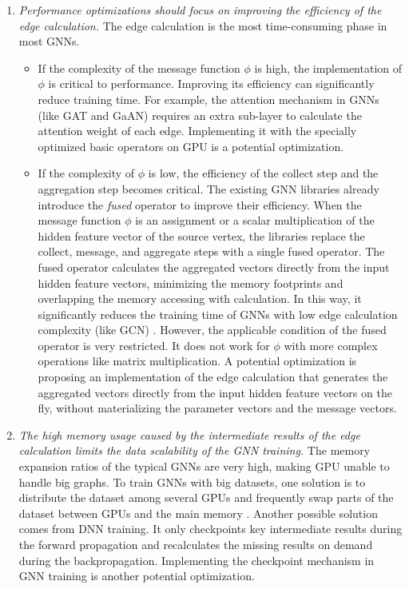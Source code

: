 \begin{enumerate}
    \item \emph{Performance optimizations should focus on improving the efficiency of the edge calculation.}
          The edge calculation is the most time-consuming phase in most GNNs.
          \begin{itemize}
              \item If the complexity of the message function $\phi$ is high, the implementation of $\phi$ is critical to performance.
                    Improving its efficiency can significantly reduce training time.
                    For example, the attention mechanism in GNNs (like GAT and GaAN) requires an extra sub-layer to calculate the attention weight of each edge.
                    Implementing it with the specially optimized basic operators on GPU is a potential optimization.
              \item If the complexity of $\phi$ is low, the efficiency of the collect step and the aggregation step becomes critical.
                    The existing GNN libraries \cite{DGL, PyG, ma2019_neugraph} already introduce the \emph{fused} operator to improve their efficiency.
                    When the message function $\phi$ is an assignment or a scalar multiplication of the hidden feature vector of the source vertex, the libraries replace the collect, message, and aggregate steps with a single fused operator.
                    The fused operator calculates the aggregated vectors directly from the input hidden feature vectors, minimizing the memory footprints and overlapping the memory accessing with calculation.
                    In this way, it significantly reduces the training time of GNNs with low edge calculation complexity (like GCN) \cite{yan2020_characterizing_gcn, zhang2020_analysis_neugraph}.
                    However, the applicable condition of the fused operator is very restricted.
                    It does not work for $\phi$ with more complex operations like matrix multiplication.
                    A potential optimization is proposing an implementation of the edge calculation that generates the aggregated vectors directly from the input hidden feature vectors on the fly, without materializing the parameter vectors and the message vectors.
          \end{itemize}
    \item \emph{The high memory usage caused by the intermediate results of the edge calculation limits the data scalability of the GNN training.}
          The memory expansion ratios of the typical GNNs are very high, making GPU unable to handle big graphs.
          To train GNNs with big datasets, one solution is to distribute the dataset among several GPUs and frequently swap parts of the dataset between GPUs and the main memory \cite{ma2019_neugraph}.
          Another possible solution \cite{chen2016_training_deep} comes from DNN training.
          It only checkpoints key intermediate results during the forward propagation and recalculates the missing results on demand during the backpropagation.
          Implementing the checkpoint mechanism in GNN training is another potential optimization.


\end{enumerate}
